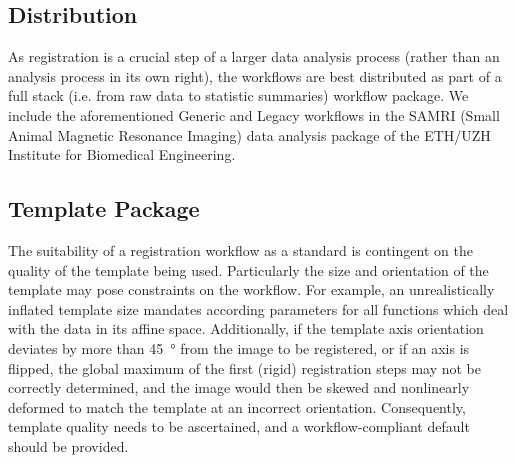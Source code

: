 \subsection{Distribution}

As registration is a crucial step of a larger data analysis process (rather than an analysis process in its own right), the workflows are best distributed as part of a full stack (i.e. from raw data to statistic summaries) workflow package.
We include the aforementioned Generic and Legacy workflows in the SAMRI (Small Animal Magnetic Resonance Imaging) data analysis package \cite{samri} of the ETH/UZH Institute for Biomedical Engineering.

\subsection{Template Package}


The suitability of a registration workflow as a standard is contingent on the quality of the template being used.
Particularly the size and orientation of the template may pose constraints on the workflow.
For example, an unrealistically inflated template size mandates according parameters for all functions which deal with the data in its affine space.
Additionally, if the template axis orientation deviates by more than \SI{45}{\degree} from the image to be registered, or if an axis is flipped, the global maximum of the first (rigid) registration steps may not be correctly determined, and the image would then be skewed and nonlinearly deformed to match  the template at an incorrect orientation.
Consequently, template quality needs to be ascertained, and a workflow-compliant default should be provided.

